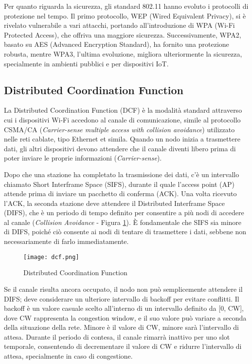 Per quanto riguarda la sicurezza, gli standard 802.11 hanno evoluto i protocolli di protezione nel tempo. Il primo protocollo, WEP (Wired Equivalent Privacy), si è rivelato vulnerabile a vari attacchi, portando all'introduzione di WPA (Wi-Fi Protected Access), che offriva una maggiore sicurezza. Successivamente, WPA2, basato su AES (Advanced Encryption Standard), ha fornito una protezione robusta, mentre WPA3, l'ultima evoluzione, migliora ulteriormente la sicurezza, specialmente in ambienti pubblici e per dispositivi IoT.

\subsection[DCF]{Distributed Coordination Function}
La Distributed Coordination Function (DCF) è la modalità standard attraverso cui i dispositivi Wi-Fi accedono al canale di comunicazione, simile al protocollo CSMA/CA (\textit{Carrier-sense multiple access with collision avoidance}) utilizzato nelle reti cablate, tipo Ethernet et simila. Quando un nodo inizia a trasmettere dati, gli altri dispositivi devono attendere che il canale diventi libero prima di poter inviare le proprie informazioni (\textit{Carrier-sense}).

Dopo che una stazione ha completato la trasmissione dei dati, c'è un intervallo chiamato Short Interframe Space (SIFS), durante il quale l'access point (AP) attende prima di inviare un pacchetto di conferma (ACK). Una volta ricevuto l'ACK, la seconda stazione deve attendere il Distributed Interframe Space (DIFS), che è un periodo di tempo definito per consentire a più nodi di accedere al canale (\textit{Collision Avoidance} - Figura \ref{fig:dcf}). È fondamentale che SIFS sia minore di DIFS, poiché ciò consente ai nodi di tentare di trasmettere i dati, sebbene non necessariamente di farlo immediatamente.

\begin{figure}[h!]
    \centering
    \texttt{[image: dcf.png]}
    \caption{Distributed Coordination Function}
    \label{fig:dcf}
\end{figure}

Se il canale risulta ancora occupato, il nodo non può semplicemente attendere il DIFS; deve considerare un ulteriore intervallo di backoff per evitare conflitti. Il backoff è un valore casuale scelto all'interno di un intervallo definito da [0, CW], dove CW rappresenta la congestion window, e il suo valore può variare a seconda della situazione della rete. Minore è il valore di CW, minore sarà l'intervallo di attesa. Durante il periodo di contesa, il canale rimarrà inattivo per uno slot temporale, consentendo di decrementare il valore di CW e ridurre l'intervallo di attesa, specialmente in caso di congestione.

